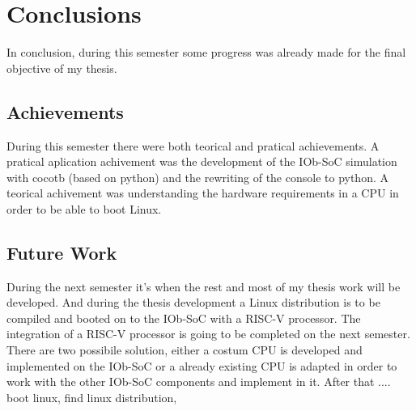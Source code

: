 
\chapter{Conclusions}
\label{chapter:conclusions}

\quad In conclusion, during this semester some progress was already made for the final objective of my thesis.

\section{Achievements}
\label{section:achievements}

\quad During this semester there were both teorical and pratical achievements. A pratical aplication achivement was the development of the IOb-SoC simulation with cocotb (based on python) and the rewriting of the console to python. A teorical achivement was understanding the hardware requirements in a CPU in order to be able to boot Linux.


\section{Future Work}
\label{section:future}

\quad During the next semester it's when the rest and most of my thesis work will be developed. And during the thesis development a Linux distribution is to be compiled and booted on to the IOb-SoC with a RISC-V processor. The integration of a RISC-V processor is going to be completed on the next semester. There are two possibile solution, either a costum CPU is developed and implemented on the IOb-SoC or a already existing CPU is adapted in order to work with the other IOb-SoC components and implement in it. After that .... boot linux, find linux distribution, 
